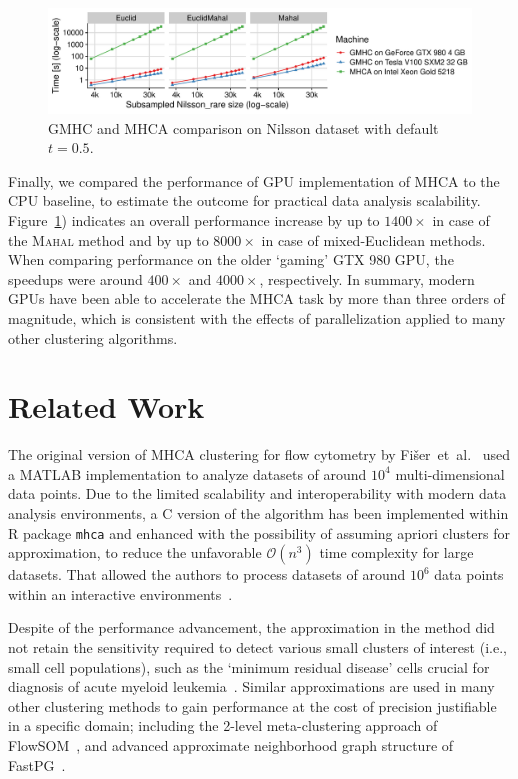 \begin{figure}[t]
	\centering
	\includegraphics[width=12cm]{Mahalanobis/img/comparison.pdf}
	\caption{GMHC and MHCA comparison on Nilsson dataset with default $t=0.5$.}
	\label{fig:perf_comp}
\end{figure}

Finally, we compared the performance of GPU implementation of MHCA to the CPU baseline, to estimate the outcome for practical data analysis scalability.
Figure~\ref{fig:perf_comp}) indicates an overall performance increase by up to $1400\times$ in case of the \textsc{Mahal} method and by up to $8000\times$ in case of mixed-Euclidean methods.
When comparing performance on the older `gaming' GTX 980 GPU, the speedups were around $400\times$ and $4000\times$, respectively.
In summary, modern GPUs have been able to accelerate the MHCA task by more than three orders of magnitude, which is consistent with the effects of parallelization applied to many other clustering algorithms.


\section{Related Work}\label{sec:maha_relwork}

The original version of MHCA clustering for flow cytometry by Fišer~et~al.~\cite{fivser2012detection} used a MATLAB implementation to analyze datasets of around $10^4$ multi-dimensional data points.
Due to the limited scalability and interoperability with modern data analysis environments, a C version of the algorithm has been implemented within R package \texttt{mhca} and enhanced with the possibility of assuming apriori clusters for approximation, to reduce the unfavorable $\mathcal{O}(n^3)$ time complexity for large datasets.
That allowed the authors to process datasets of around $10^6$ data points within an interactive environments~\cite{kratochvil2020shinysom}.

Despite of the performance advancement, the approximation in the method did not retain the sensitivity required to detect various small clusters of interest (i.e., small cell populations), such as the `minimum residual disease' cells crucial for diagnosis of acute myeloid leukemia~\cite{fivser2012detection}.
Similar approximations are used in many other clustering methods to gain performance at the cost of precision justifiable in a specific domain; including the 2-level meta-clustering approach of FlowSOM~\cite{gassen2015flowsom}, and advanced approximate neighborhood graph structure of FastPG~\cite{fastpg}.

